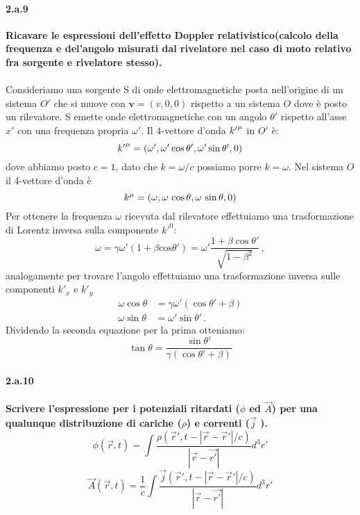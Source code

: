 \documentclass[twoside]{article}
\begin{document}
\paragraph{2.a.9}\textbf{Ricavare le espressioni dell'effetto Doppler relativistico(calcolo della frequenza e del'angolo misurati dal rivelatore nel caso di moto relativo fra sorgente e rivelatore stesso).}\\ \\
Consideriamo una sorgente S di onde elettromagnetiche posta nell'origine di un sistema $O'$ che si muove con $\mathbf{v}=(v,0,0)$ rispetto a un sistema $O$ dove è posto un rilevatore. S emette onde elettromagnetiche con un angolo $\theta'$ rispetto all'asse $x'$ con una frequenza propria $\omega'$. Il 4-vettore d'onda $\tensor{{k'}}{^{\mu}}$ in $O'$ è:
\begin{equation*}
    \tensor{{k'}}{^{\mu}}=(\omega',\omega'\cos\theta',\omega'\sin\theta',0)
\end{equation*}
dove abbiamo posto $c=1$, dato che $k=\omega/c$ possiamo porre $k=\omega$. Nel sistema $O$ il 4-vettore d'onda è 
\begin{equation*}
    \tensor{k}{^{\mu}}=(\omega,\omega\,\cos\theta,\omega\,\sin\theta,0)
\end{equation*}
Per ottenere la frequenza $\omega$ ricevuta dal rilevatore effettuiamo una trasformazione di Lorentz inversa sulla componente ${k'}^0$:
\begin{equation*}
    \omega=\gamma\omega'(1+\beta\text{cos}\theta')=\omega'\frac{1+\beta\cos\theta'}{\sqrt{1-\beta^2}}\, ,
\end{equation*}
analogamente per trovare l'angolo effettuiamo una trasformazione inversa sulle componenti ${k'}_x$ e ${k'}_y$
\begin{align*}
\omega\cos\theta&=\gamma\omega'(\cos\theta'+\beta) \\ 
\omega\sin\theta&=\omega'\sin\theta' \, .
\end{align*}
Dividendo la seconda equazione per la prima otteniamo:
\begin{equation*}
    \tan\theta=\frac{\sin\theta'}{\gamma(\cos\theta'+\beta)}
\end{equation*}
\paragraph{2.a.10}\textbf{Scrivere l’espressione per i potenziali ritardati ($\phi$ ed $\vec{A}$) per una qualunque
distribuzione di cariche ($\rho$) e correnti ($\vec{j}$ ).}\\
\[
\phi(\vec{r},t)=\int\frac{\rho(\vec{r}', t- |\vec{r}-\vec{r}'|/c)}{|\vec{r}-\vec{r'}|} d^3r'
\]
\[
\vec{A}(\vec{r},t)=\frac{1}{c}\int \frac{\vec{j}(\vec{r}', t- |\vec{r}-\vec{r}'|/c)}{|\vec{r}-\vec{r'}|} d^3r'
\]
\end{document}
